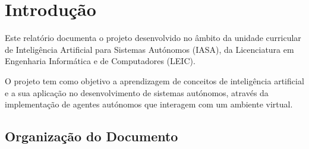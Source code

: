 \chapter{Introdução}\label{ch:introducao}

Este relatório documenta o projeto desenvolvido no âmbito da unidade curricular de Inteligência Artificial para Sistemas Autónomos (IASA), da Licenciatura em Engenharia Informática e de Computadores (LEIC).

O projeto tem como objetivo a aprendizagem de conceitos de inteligência artificial e a sua aplicação no desenvolvimento de sistemas autónomos, através da implementação de agentes autónomos que interagem com um ambiente virtual.

\section{Organização do Documento}\label{sec:organizacao-documento}


